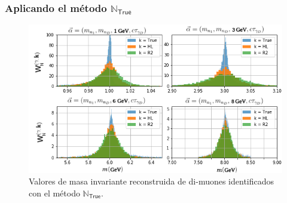 \subsubsection{Aplicando el método $\mathbb{N}_\textsf{True}$}


\begin{figure}[!t]
\centering
\includegraphics[width=.95\textwidth]{Cap4/imagenes/foton_mass.png}
\caption{Valores de masa invariante reconstruida de di-muones identificados con el método $\mathbb{N}_\textsf{True}$.}
\label{mass_inv}
\end{figure}

